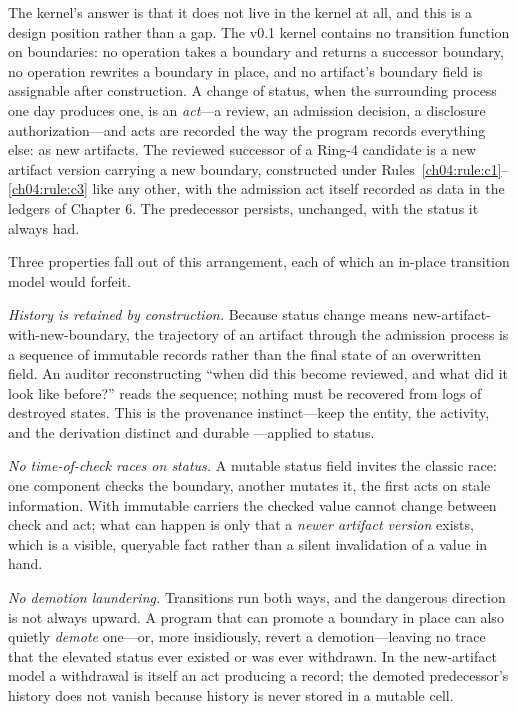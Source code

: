 The kernel's answer is that it does not live in the kernel at all, and
this is a design position rather than a gap. The v0.1 kernel contains no
transition function on boundaries: no operation takes a boundary and
returns a successor boundary, no operation rewrites a boundary in place,
and no artifact's boundary field is assignable after construction. A
change of status, when the surrounding process one day produces one, is
an \emph{act}---a review, an admission decision, a disclosure
authorization---and acts are recorded the way the program records
everything else: as new artifacts. The reviewed successor of a Ring-4
candidate is a new artifact version carrying a new boundary, constructed
under Rules~\ref{ch04:rule:c1}--\ref{ch04:rule:c3} like any other, with
the admission act itself recorded as data in the ledgers of Chapter 6.
The predecessor persists, unchanged, with the status it always had.

Three properties fall out of this arrangement, each of which an in-place
transition model would forfeit.

\emph{History is retained by construction.} Because status change means
new-artifact-with-new-boundary, the trajectory of an artifact through
the admission process is a sequence of immutable records rather than the
final state of an overwritten field. An auditor reconstructing ``when
did this become reviewed, and what did it look like before?'' reads the
sequence; nothing must be recovered from logs of destroyed states. This
is the provenance instinct---keep the entity, the activity, and the
derivation distinct and durable \cite{prov}---applied to status.

\emph{No time-of-check races on status.} A mutable status field invites
the classic race: one component checks the boundary, another mutates it,
the first acts on stale information. With immutable carriers the checked
value cannot change between check and act; what can happen is only that
a \emph{newer artifact version} exists, which is a visible, queryable
fact rather than a silent invalidation of a value in hand.

\emph{No demotion laundering.} Transitions run both ways, and the
dangerous direction is not always upward. A program that can promote a
boundary in place can also quietly \emph{demote} one---or, more
insidiously, revert a demotion---leaving no trace that the elevated
status ever existed or was ever withdrawn. In the new-artifact model a
withdrawal is itself an act producing a record; the demoted
predecessor's history does not vanish because history is never stored
in a mutable cell.

